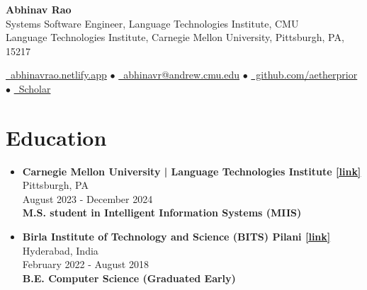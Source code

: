 \documentclass[11pt,letterpaper]{article}
\begin{document}
    
    \begin{center}
        {\Huge\bfseries Abhinav Rao}\\[2mm]
        {\large Systems Software Engineer, Language Technologies Institute, CMU}\\[1mm]
        {\small Language Technologies Institute, Carnegie Mellon University, Pittsburgh, PA, 15217}
    \end{center}
    
    \begin{center}
    \href{https://abhinavrao.netlify.app}{\faGlobe\ abhinavrao.netlify.app} $\bullet$ \href{mailto:abhinavr@andrew.cmu.edu}{\faEnvelope\ abhinavr@andrew.cmu.edu} $\bullet$ \href{https://github.com/aetherprior}{\faGithub\ github.com/aetherprior} $\bullet$ \href{https://scholar.google.com/citations?user=U_wk4ssAAAAJ}{\faGraduationCap\ Scholar}
    \end{center}
    
    \section*{Education}
    \begin{itemize}[leftmargin=*,label={},itemsep=4pt]
        \item \textbf{Carnegie Mellon University | Language Technologies Institute  \href{https://lti.cs.cmu.edu}{[link]}} \hfill Pittsburgh, PA\\
            August 2023 - December 2024\\
            \textbf{\textit{} M.S. student in Intelligent Information Systems (MIIS)}
        \item \textbf{Birla Institute of Technology and Science (BITS) Pilani  \href{https://www.bits-pilani.ac.in/hyderabad/}{[link]}} \hfill Hyderabad, India\\
            February 2022 - August 2018\\
            \textbf{\textit{} B.E. Computer Science (Graduated Early)}
    \end{itemize}
    
\end{document}
